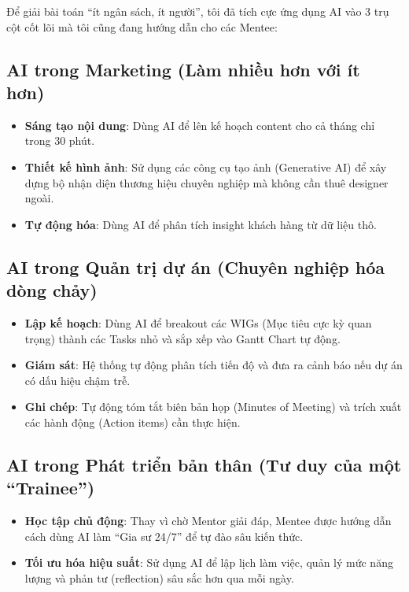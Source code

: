 Để giải bài toán ``ít ngân sách, ít người'', tôi đã tích cực ứng dụng AI vào 3 trụ cột cốt lõi mà tôi cũng đang hướng dẫn cho các Mentee:

\subsection{AI trong Marketing (Làm nhiều hơn với ít hơn)}
\begin{itemize}
    \item \textbf{Sáng tạo nội dung}: Dùng AI để lên kế hoạch content cho cả tháng chỉ trong 30 phút.
    \item \textbf{Thiết kế hình ảnh}: Sử dụng các công cụ tạo ảnh (Generative AI) để xây dựng bộ nhận diện thương hiệu chuyên nghiệp mà không cần thuê designer ngoài.
    \item \textbf{Tự động hóa}: Dùng AI để phân tích insight khách hàng từ dữ liệu thô.
\end{itemize}

\subsection{AI trong Quản trị dự án (Chuyên nghiệp hóa dòng chảy)}
\begin{itemize}
    \item \textbf{Lập kế hoạch}: Dùng AI để breakout các WIGs (Mục tiêu cực kỳ quan trọng) thành các Tasks nhỏ và sắp xếp vào Gantt Chart tự động.
    \item \textbf{Giám sát}: Hệ thống tự động phân tích tiến độ và đưa ra cảnh báo nếu dự án có dấu hiệu chậm trễ.
    \item \textbf{Ghi chép}: Tự động tóm tắt biên bản họp (Minutes of Meeting) và trích xuất các hành động (Action items) cần thực hiện.
\end{itemize}

\subsection{AI trong Phát triển bản thân (Tư duy của một ``Trainee'')}
\begin{itemize}
    \item \textbf{Học tập chủ động}: Thay vì chờ Mentor giải đáp, Mentee được hướng dẫn cách dùng AI làm ``Gia sư 24/7'' để tự đào sâu kiến thức.
    \item \textbf{Tối ưu hóa hiệu suất}: Sử dụng AI để lập lịch làm việc, quản lý mức năng lượng và phản tư (reflection) sâu sắc hơn qua mỗi ngày.
\end{itemize}

